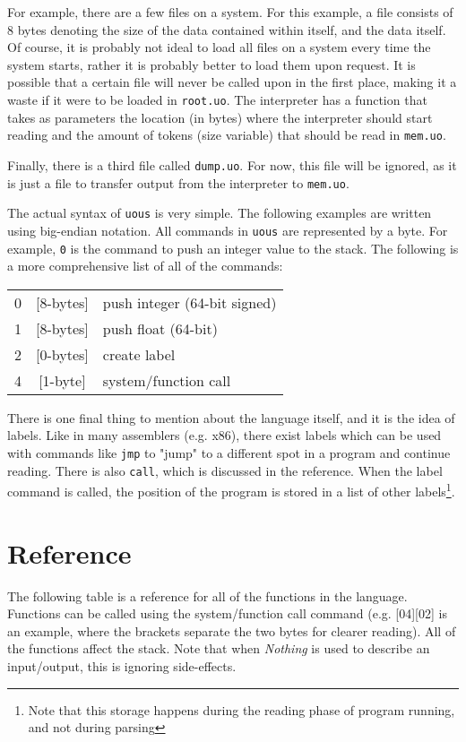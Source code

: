 \documentclass[12pt]{report}
\begin{document}
  For example, there are a few files on a system.  For this example, a
  file consists of 8 bytes denoting the size of the data contained within itself, and
  the data itself.  Of course, it is probably not ideal to load all files on a
  system every time the system starts, rather it is probably better to load them
  upon request.  It is possible that a certain file will never be called upon in the
  first place, making it a waste if it were to be loaded in \verb|root.uo|.  The
  interpreter has a function that takes as parameters the location (in bytes) where
  the interpreter should start reading and the amount of tokens (size variable) that
  should be read in \verb|mem.uo|.

  Finally, there is a third file called \verb|dump.uo|.  For now, this file will be
  ignored, as it is just a file to transfer output from the interpreter to
  \verb|mem.uo|.

  The actual syntax of \verb|uous| is very simple.  The following examples are
  written using big-endian notation.  All commands in \verb|uous| are represented
  by a byte.  For example, \verb|0| is the command to push an integer value to the
  stack.  The following is a more comprehensive list of all of the commands:
  \begin{tabular}{ r | c || l }
  0 & [8-bytes] & push integer (64-bit signed) \\
  1 & [8-bytes] & push float (64-bit) \\
  2 & [0-bytes] & create label \\
  4 & [1-byte] & system/function call \\
  \end{tabular}

  There is one final thing to mention about the language itself, and it is the idea
  of labels.  Like in many assemblers (e.g. x86), there exist labels which can be
  used with commands like \verb|jmp| to "jump" to a different spot in a program and
  continue reading.  There is also \verb|call|, which is discussed in the reference.
  When the label command is called, the position of the program is stored in a list
  of other labels\footnote{Note that this storage happens during the reading phase
  of program running, and not during parsing}.

  \chapter{Reference}
  The following table is a reference for all of the functions in the language.
  Functions can be called using the system/function call command (e.g.
  [04][02] is an example, where the brackets separate the two bytes for clearer
  reading).  All of the functions affect the stack.  Note that when \emph{Nothing} is
  used to describe an input/output, this is ignoring side-effects.
\end{document}

